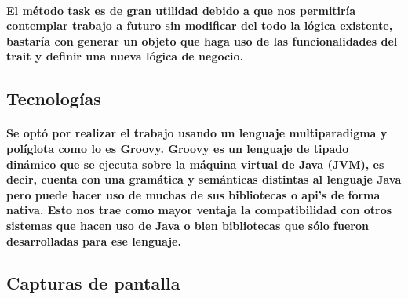     \paragraph{El método task es de gran utilidad debido a que nos permitiría contemplar trabajo a futuro sin modificar del todo la lógica existente, bastaría con generar un objeto que haga uso de las funcionalidades del trait y definir una nueva lógica de negocio.}
  \subsection{Tecnologías}
    \paragraph{Se optó por realizar el trabajo usando un lenguaje multiparadigma y políglota como lo es \textbf{Groovy}. Groovy es un lenguaje de tipado dinámico que se ejecuta sobre la máquina virtual de Java (JVM), es decir, cuenta con una gramática y semánticas distintas al lenguaje Java pero puede hacer uso de muchas de sus bibliotecas o api's de forma nativa. Esto nos trae como mayor ventaja la compatibilidad con otros sistemas que hacen uso de Java o bien bibliotecas que sólo fueron desarrolladas para ese lenguaje.}
  \subsection{Capturas de pantalla}  